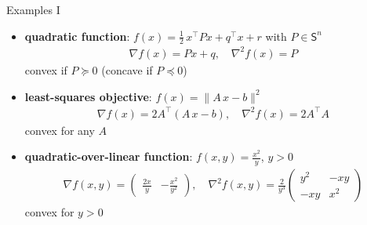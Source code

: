 \documentclass[10pt,handout]{beamer}
\newcommand{\ds}{\displaystyle}
\theoremstyle{definition}
\begin{document}
\begin{frame}{Examples I}
  \begin{itemize}
    \item {\bf quadratic function}: $\ds f(x) = \frac{1}{2}\,x^\top P x + q^\top x + r$ with $P\in\mathsf{S}^n$ 
      \begin{align*}
        \nabla f(x) = P x + q,\quad \nabla^2 f(x) = P
      \end{align*}
      convex if $P\succcurlyeq 0$ (concave if $P\preccurlyeq 0$)
    \item {\bf least-squares objective}: $\ds f(x) = \|A\,x - b\|^2$ 
      \begin{align*}
        \nabla f(x) = 2A^\top(A\,x - b),\quad \nabla^2 f(x) = 2 A^\top A 
      \end{align*}
      convex for any $A$
    \item {\bf quadratic-over-linear function}: $\ds f(x, y) = \frac{x^2}{y}$, $y > 0$ 
      \begin{align*}
        \nabla f(x, y) = \begin{pmatrix}\frac{2x}{y} & -\frac{x^2}{y^2}\end{pmatrix},\quad \nabla^2 f(x, y) = \frac{2}{y^3}\begin{pmatrix}y^2 & -xy \\ -xy & x^2 \end{pmatrix}
      \end{align*}
      convex for $y > 0$
  \end{itemize}
\end{frame}
\end{document}
